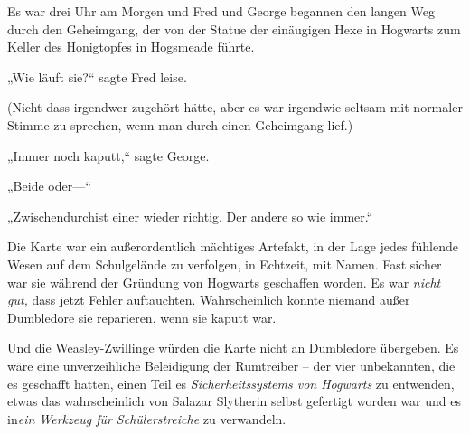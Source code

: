 Es war drei Uhr am Morgen und Fred und George begannen den langen Weg durch den Geheimgang, der von der Statue der einäugigen Hexe in Hogwarts zum Keller des Honigtopfes in Hogsmeade führte.

„Wie läuft sie?“ sagte Fred leise.

(Nicht dass irgendwer zugehört hätte, aber es war irgendwie seltsam mit normaler Stimme zu sprechen, wenn man durch einen Geheimgang lief.)

„Immer noch kaputt,“ sagte George.

„Beide oder—“

„Zwischendurchist einer wieder richtig. Der andere so wie immer.“

Die Karte war ein außerordentlich mächtiges Artefakt, in der Lage jedes fühlende Wesen auf dem Schulgelände zu verfolgen, in Echtzeit, mit Namen. Fast sicher war sie während der Gründung von Hogwarts geschaffen worden. Es war \emph{nicht gut,} dass jetzt Fehler auftauchten. Wahrscheinlich konnte niemand außer Dumbledore sie reparieren, wenn sie kaputt war.

Und die Weasley-Zwillinge würden die Karte nicht an Dumbledore übergeben. Es wäre eine unverzeihliche Beleidigung der Rumtreiber -- der vier unbekannten, die es geschafft hatten, einen Teil es \emph{Sicherheitssystems von Hogwarts} zu entwenden, etwas das wahrscheinlich von Salazar Slytherin selbst gefertigt worden war und es in\emph{ein Werkzeug für Schülerstreiche} zu verwandeln.

